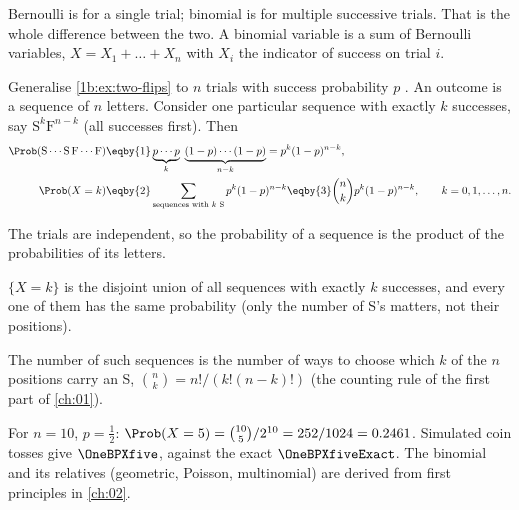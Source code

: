 Bernoulli is for a single trial; binomial is for multiple successive trials.
That is the whole difference between the two. A binomial variable is a sum of Bernoulli variables,
$X=X_1+\dots+X_n$ with $X_i$ the indicator of success on trial $i$.

\label{1b:ex:binomial}
Generalise \cref{1b:ex:two-flips} to $n$ trials with success probability
$p$ . An outcome is
a sequence of $n$ letters. Consider one particular sequence with exactly $k$
successes, say $\mathrm{S}^k\mathrm{F}^{n-k}$ (all successes first). Then
\begin{align*}
  \Prob(\mathrm{S}\cdots\mathrm{S}\,\mathrm{F}\cdots\mathrm{F})
  &\eqby{1} \underbrace{p\cdots p}_{k}\;\underbrace{(1-p)\cdots(1-p)}_{n-k}
   = p^k(1-p)^{n-k},\\
  \Prob(X=k)
  &\eqby{2} \sum_{\text{sequences with $k$ S}} p^k(1-p)^{n-k}
   \eqby{3} \binom{n}{k}p^k(1-p)^{n-k},\qquad k=0,1,\dots,n .
\end{align*}
\begin{explain}
  \item The trials are independent, so the probability of a sequence is the
        product of the probabilities of its letters.
  \item $\{X=k\}$ is the disjoint union of all sequences with exactly $k$
        successes, and every one of them has the same probability (only the
        number of S's matters, not their positions).
  \item The number of such sequences is the number of ways to choose which
        $k$ of the $n$ positions carry an S, $\binom{n}{k}=n!/(k!(n-k)!)$
        (the counting rule of the first part of \cref{ch:01}).
\end{explain}
For $n=10$, $p=\tfrac12$: $\Prob(X=5)=\binom{10}{5}/2^{10}=252/1024=0.2461$.
Simulated coin tosses give $\OneBPXfive$, against the exact
$\OneBPXfiveExact$. The binomial and its relatives (geometric, Poisson,
multinomial) are derived from first principles in \cref{ch:02}.

